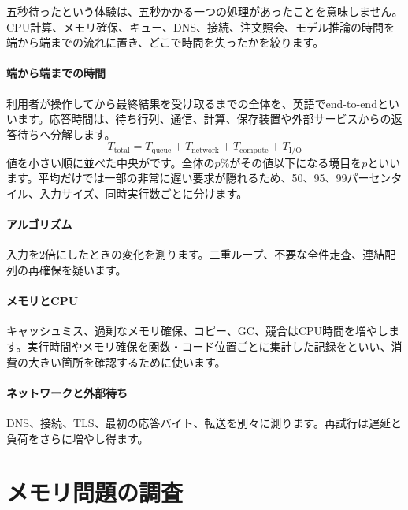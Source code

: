 五秒待ったという体験は、五秒かかる一つの処理があったことを意味しません。CPU計算、メモリ確保、キュー、DNS、接続、注文照会、モデル推論の時間を端から端までの流れに置き、どこで時間を失ったかを絞ります。

\begingroup
\begingroup
\paragraph{端から端までの時間}
        利用者が操作してから最終結果を受け取るまでの全体を、英語でend-to-endといいます。応答時間は、待ち行列、通信、計算、保存装置や外部サービスからの返答待ちへ分解します。
        \[
          T_{\mathrm{total}}=
          T_{\mathrm{queue}}+T_{\mathrm{network}}+
          T_{\mathrm{compute}}+T_{\mathrm{I/O}}
        \]
        値を小さい順に並べた中央がです。全体の$p$\%がその値以下になる境目を$p$といいます。平均だけでは一部の非常に遅い要求が隠れるため、50、95、99パーセンタイル、入力サイズ、同時実行数ごとに分けます。

\paragraph{アルゴリズム}
        入力を2倍にしたときの変化を測ります。二重ループ、不要な全件走査、連結配列の再確保を疑います。

\par
\endgroup
\medskip
\begingroup
\paragraph{メモリとCPU}
        キャッシュミス、過剰なメモリ確保、コピー、GC、競合はCPU時間を増やします。実行時間やメモリ確保を関数・コード位置ごとに集計した記録をといい、消費の大きい箇所を確認するために使います。

\paragraph{ネットワークと外部待ち}
        DNS、接続、TLS、最初の応答バイト、転送を別々に測ります。再試行は遅延と負荷をさらに増やし得ます。

\par
\endgroup
\par
\endgroup


\section{メモリ問題の調査}
\label{sec:07-practice-09}

